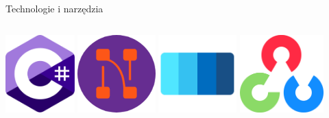 \documentclass[aspectratio=1610,handout]{beamer}
\theoremstyle{definition}
\begin{document}
\begin{frame}{Technologie i narzędzia}
 \begin{columns}[t]
        \centering
        \includegraphics[height=3cm]{./imgs/csharp.png}
        \includegraphics[height=3cm]{./imgs/nodify.png}
        \centering
        \includegraphics[height=3cm]{./imgs/wpfui.png}
        \includegraphics[height=3cm]{./imgs/OpenCV.png}
    \end{columns}
\end{frame}
\end{document}
